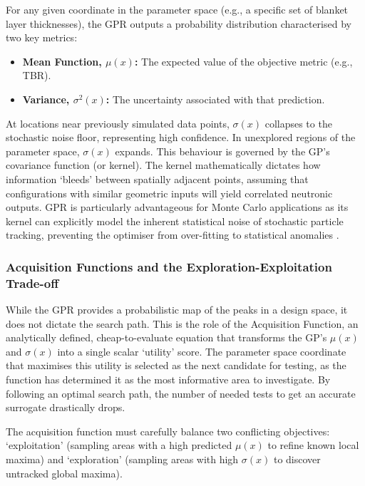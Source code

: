 \documentclass[11pt]{article}
\begin{document}
For any given coordinate in the parameter space (e.g., a specific set of blanket layer thicknesses),
the GPR outputs a probability distribution characterised by two key metrics:
\begin{itemize}
    \item \textbf{Mean Function, $\mu(x)$:} The expected value of the objective metric (e.g., TBR).
    \item \textbf{Variance, $\sigma^2(x)$:} The uncertainty associated with that prediction.
\end{itemize}

At locations near previously simulated data points, $\sigma(x)$ collapses to the stochastic noise
floor, representing high confidence. In unexplored regions of the parameter space, $\sigma(x)$
expands. This behaviour is governed by the GP's covariance function (or kernel). The kernel
mathematically dictates how information `bleeds' between spatially adjacent points, assuming that
configurations with similar geometric inputs will yield correlated neutronic outputs. GPR is
particularly advantageous for Monte Carlo applications as its kernel can explicitly model the
inherent statistical noise of stochastic particle tracking, preventing the optimiser from
over-fitting to statistical anomalies \citep{snoek2012practical}.

\subsubsection{Acquisition Functions and the Exploration-Exploitation Trade-off}

While the GPR provides a probabilistic map of the peaks in a design space, it does not dictate the
search path. This is the role of the Acquisition Function, an analytically defined,
cheap-to-evaluate equation that transforms the GP's $\mu(x)$ and $\sigma(x)$ into a single scalar
`utility' score. The parameter space coordinate that maximises this utility is selected as the next
candidate for testing, as the function has determined it as the most informative area to
investigate. By following an optimal search path, the number of needed tests to get an accurate
surrogate drastically drops.

The acquisition function must carefully balance two conflicting objectives: `exploitation' (sampling
areas with a high predicted $\mu(x)$ to refine known local maxima) and `exploration' (sampling areas
with high $\sigma(x)$ to discover untracked global maxima).
\end{document}
